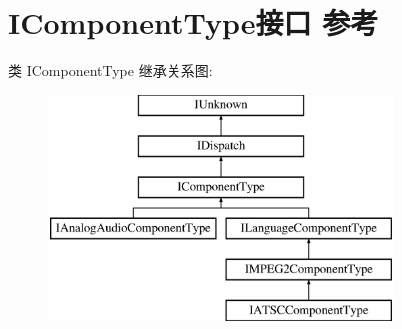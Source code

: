 \hypertarget{interface_i_component_type}{}\section{I\+Component\+Type接口 参考}
\label{interface_i_component_type}
类 I\+Component\+Type 继承关系图\+:\begin{figure}[H]
\begin{center}
\leavevmode
\includegraphics[height=6.000000cm]{interface_i_component_type}
\end{center}
\end{figure}
